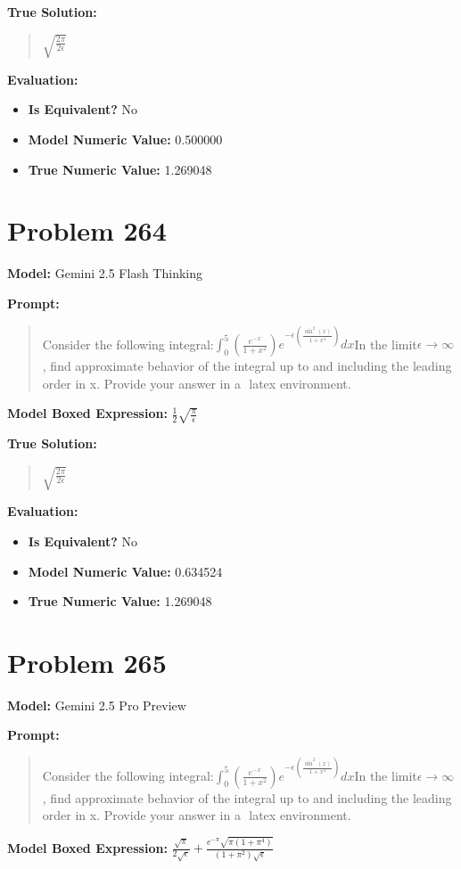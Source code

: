 \documentclass{article}
\begin{document}
{\textbf{True Solution:}
\begin{quote}
$\sqrt{\frac{2 \pi}{2 \epsilon}}$
\end{quote}

\textbf{Evaluation:}
\begin{itemize}
\item \textbf{Is Equivalent?} No
\item \textbf{Model Numeric Value:} 0.500000
\item \textbf{True Numeric Value:} 1.269048
\end{itemize}
\vspace{1cm}
\section*{Problem 264}
\textbf{Model:} Gemini 2.5 Flash Thinking

\textbf{Prompt:}
\begin{quote}
Consider the following integral:$\int_0^{5} ( \frac{e^{-x}}{1 + x^2}) e^{-\epsilon (\frac{\sin^2(x)}{1 + x^4})} dx$In the limit$\epsilon \rightarrow \infty$, find approximate behavior of the integral up to and including the leading order in x. Provide your answer in a $\boxed{}$ latex environment.
\end{quote}
\textbf{Model Boxed Expression:} $\frac{1}{2}\sqrt{\frac{\pi}{\epsilon}}$

\textbf{True Solution:}
\begin{quote}
$\sqrt{\frac{2 \pi}{2 \epsilon}}$
\end{quote}

\textbf{Evaluation:}
\begin{itemize}
\item \textbf{Is Equivalent?} No
\item \textbf{Model Numeric Value:} 0.634524
\item \textbf{True Numeric Value:} 1.269048
\end{itemize}
\vspace{1cm}
\section*{Problem 265}
\textbf{Model:} Gemini 2.5 Pro Preview

\textbf{Prompt:}
\begin{quote}
Consider the following integral:$\int_0^{5} ( \frac{e^{-x}}{1 + x^2}) e^{-\epsilon (\frac{\sin^2(x)}{1 + x^4})} dx$In the limit$\epsilon \rightarrow \infty$, find approximate behavior of the integral up to and including the leading order in x. Provide your answer in a $\boxed{}$ latex environment.
\end{quote}
\textbf{Model Boxed Expression:} $ \frac{\sqrt{\pi}}{2\sqrt{\epsilon}} + \frac{e^{-\pi}\sqrt{\pi(1+\pi^4)}}{(1+\pi^2)\sqrt{\epsilon}} $

}
\end{document}

